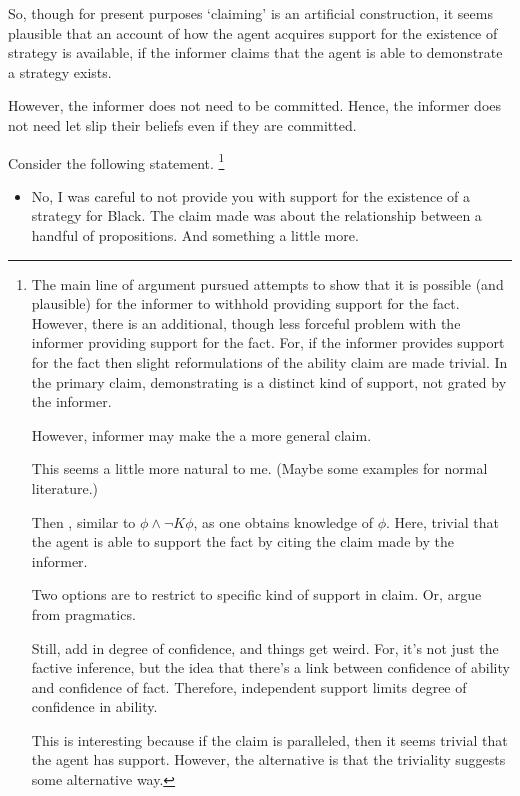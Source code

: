 \documentclass[10pt]{article}
\begin{document}
So, though for present purposes `claiming' is an artificial construction, it seems plausible that an account of how the agent acquires support for the existence of strategy is available, if the informer claims that the agent is able to demonstrate a strategy exists.

However, the informer does not need to be committed.
Hence, the informer does not need let slip their beliefs even if they are committed.

Consider the following statement.\nolinebreak
\footnote{
  The main line of argument pursued attempts to show that it is possible (and plausible) for the informer to withhold providing support for the fact.
  However, there is an additional, though less forceful problem with the informer providing support for the fact.
  For, if the informer provides support for the fact then slight reformulations of the ability claim are made trivial.
  In the primary claim, demonstrating is a distinct kind of support, not grated by the informer.

  However, informer may make the a more general claim.

  This seems a little more natural to me.
  (Maybe some examples for normal literature.)

  Then , similar to \(\phi \land \lnot K \phi\), as one obtains knowledge of \(\phi\).
  Here, trivial that the agent is able to support the fact by citing the claim made by the informer.

  Two options are to restrict to specific kind of support in claim.
  Or, argue from pragmatics.

  Still, add in degree of confidence, and things get weird.
  For, it's not just the factive inference, but the idea that there's a link between confidence of ability and confidence of fact.
  Therefore, independent support limits degree of confidence in ability.

  This is interesting because if the claim is paralleled, then it seems trivial that the agent has support.
  However, the alternative is that the triviality suggests some alternative way.
}

\begin{itemize}
\item\label{i:claim:no-supp} No, I was careful to not provide you with support for the existence of a strategy for Black.
  The claim made was about the relationship between a handful of propositions.
  {
    \color{red}
    And something a little more.
  }
\end{itemize}
\end{document}
